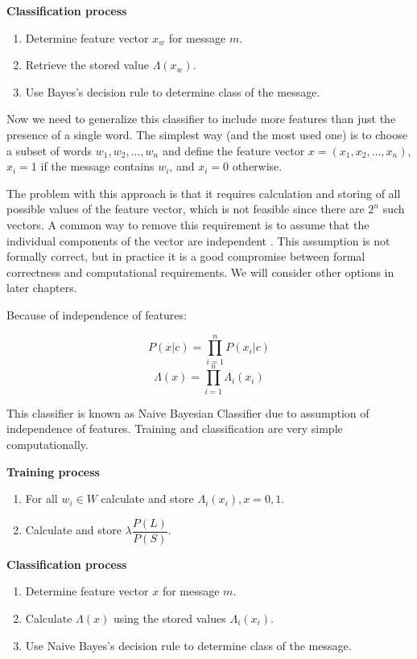 \documentclass[12pt]{report}
\begin{document}
\textbf{Classification process}

\begin{enumerate}
	\item Determine feature vector $x_w$ for message $m$.
	\item Retrieve the stored value $\Lambda(x_w)$.
	\item Use Bayes's decision rule to determine class of the message.
\end{enumerate}

Now we need to generalize this classifier to include more features than just the presence of a single word. The simplest way (and the most used one) is to choose a subset of words $w_1, w_2, \dots, w_n$ and define the feature vector $x = (x_1, x_2, \dots, x_n)$, $x_i = 1$ if the message contains $w_i$, and $x_i = 0$ otherwise.

The problem with this approach is that it requires calculation and storing of all possible values of the feature vector, which is not feasible since there are $2^n$ such vectors. A common way to remove this requirement is to assume that the individual components of the vector are independent \cite{Zhang}. This assumption is not formally correct, but in practice it is a good compromise between formal correctness and computational requirements. We will consider other options in later chapters.

Because of independence of features:

$$P(x | c) = \prod_{i=1}^{n}P(x_i | c)$$
$$\Lambda(x) = \prod_{i=1}^{n}\Lambda_i(x_i)$$

This classifier is known as Naive Bayesian Classifier due to assumption of independence of features. Training and classification are very simple computationally.

\textbf{Training process}

\begin{enumerate}
	\item For all $w_i \in W$ calculate and store $\Lambda_i(x_i), x = 0, 1$.
	\item Calculate and store $\lambda \dfrac{P(L)}{P(S)}$.
\end{enumerate}

\textbf{Classification process}

\begin{enumerate}
	\item Determine feature vector $x$ for message $m$.
	\item Calculate $\Lambda(x)$ using the stored values $\Lambda_i(x_i)$.
	\item Use Naive Bayes's decision rule to determine class of the message.
\end{enumerate}
\end{document}
